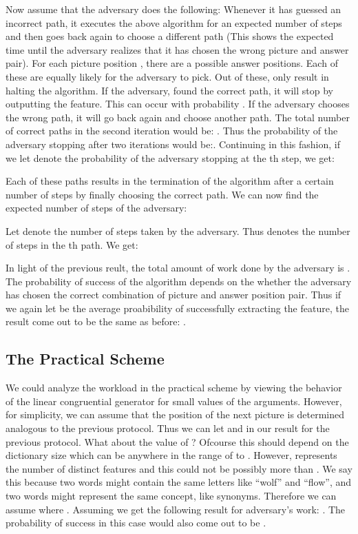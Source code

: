 \documentclass{llncs}
\begin{document}
Now assume that the adversary does the following: Whenever it has guessed an incorrect path, it executes the above algorithm for an expected number of  steps and then goes back again to choose a different path (This shows the expected time until the adversary realizes that it has chosen the wrong picture and answer pair). For each picture position , there are a possible  answer positions. Each of these are equally likely for the adversary to pick. Out of these, only  result in halting the algorithm. If the adversary, found the correct path, it will stop by outputting the feature. This can occur with probability . If the adversary chooses the wrong path, it will go back again and choose another path. The total number of correct paths in the second iteration would be: . Thus the probability of the adversary stopping after two iterations would be:. Continuing in this fashion, if we let  denote the probability of the adversary stopping at the th step, we get:


Each of these paths results in the termination of the algorithm after a certain number of steps by finally choosing the correct path. We can now find the expected number of steps of the adversary:
 
Let  denote the number of steps taken by the adversary. Thus  denotes the number of steps in the th path. We get:

In light of the previous reult, the total amount of work done by the adversary is . The probability of success of the algorithm depends on the whether the adversary has chosen the correct combination of picture and answer position pair. Thus if we again let  be the average proabibility of successfully extracting the feature, the result come out to be the same as before: .
\subsection{The Practical Scheme}
We could analyze the workload in the practical scheme by viewing the behavior of the linear congruential generator for small values of the arguments. However, for simplicity, we can assume that the position of the next picture is determined analogous to the previous protocol. Thus we can let  and  in our result for the previous protocol. What about the value of ? Ofcourse this should depend on the dictionary size  which can be anywhere in the range of  to . However,  represents the number of distinct features and this could not be possibly more than . We say this because two words might contain the same letters like ``wolf'' and ``flow'', and two words might represent the same concept, like synonyms. Therefore we can assume  where . Assuming  we get the following result for adversary's work: . The probability of success in this case would also come out to be .
\end{document}
